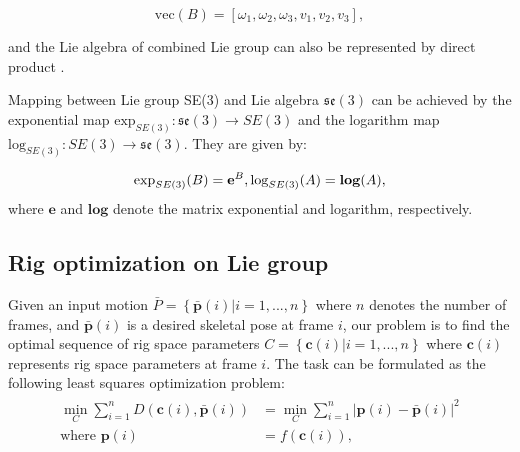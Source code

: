 \begin{equation}
	\mathrm{vec}(B)=\left [ \omega_{1},\omega_{2},\omega_{3},v_{1},v_{2},v_{3} \right ],
\end{equation}

and the Lie algebra  of combined Lie group \SE{} can also be represented by direct product \se{}.

Mapping between Lie group SE(3) and Lie algebra $\mathfrak{se}(3)$ can be achieved by the exponential map $\mathrm{exp}_{SE(3)}: \mathfrak{se}(3) \rightarrow SE(3)$ and the logarithm map $\mathrm{log}_{SE(3)} : SE(3)\rightarrow \mathfrak{se}(3)$. They are given by:

\begin{equation}
	\label{eq:logmap}
	\mathrm{exp}_{SE(3)}(B) = \mathbf{e}^{B},\\\\
	\mathrm{log}_{SE(3)}(A) = \mathbf{log}(A),
\end{equation} 
where $\mathbf{e}$ and $\mathrm{\mathbf{log}}$ denote the matrix exponential and logarithm, respectively. 

\subsection{Rig optimization on Lie group}
\label{sec:rig_opt}
Given an input motion $\bar{P}=\left\{\bar{\mathbf{p}}(i)|i=1,...,n\right\}$ where $n$ denotes the number of frames, and $\bar{\mathbf{p}}(i)$ is a desired skeletal pose at frame $i$, our problem is to find the optimal sequence of rig space parameters $C=\left\{\mathbf{c}(i)|i=1,...,n\right\}$ where $\mathbf{c}(i)$ represents rig space parameters at frame $i$.
The task can be formulated as the following least squares optimization problem:
\begin{gather}
	\begin{aligned}
	\min_{C}{\sum_{i=1}^{n}{D(\mathbf{c}(i),\bar{\mathbf{p}}(i))}} 	&= \min_{C} \sum_{i=1}^{n} \left | \mathbf{p}(i)-\bar{\mathbf{p}}(i) \right |^{2}\\
	\text{where } \mathbf{p}(i) &= f(\mathbf{c}(i)),
	\end{aligned}
\end{gather}

